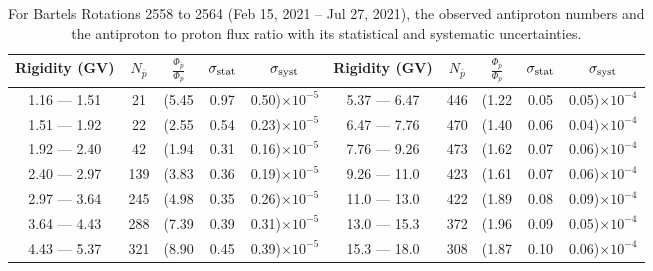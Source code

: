 \begin{table}[p] 
\renewcommand\baselinestretch{1.3}\selectfont
\setlength\tabcolsep{3pt}
\centering
\begin{tabular}{ccccc | ccccc}
\hline
\textbf{Rigidity}  (GV)  & $N_{\bar{p}}$ & $\frac{\Phi_{\bar{p}}}{\Phi_{p}}$ & $\sigma_{\rm{stat}}$ & $\sigma_{\rm{syst}}$ \hspace{1cm}   & \textbf{Rigidity}  (GV)  & $N_{\bar{p}}$ & $\frac{\Phi_{\bar{p}}}{\Phi_{p}}$ & $\sigma_{\rm{stat}}$ & $\sigma_{\rm{syst}}$ \hspace{1cm} \\ 
\hline
1.16 — 1.51   &  21                  &(5.45                          &  0.97              &      0.50)$\times 10^{-5}$  & 5.37 — 6.47                &  446                    &(1.22                               &  0.05                   &      0.05)$\times 10^{-4}$\\
1.51 — 1.92   &  22                  &(2.55                          &  0.54              &      0.23)$\times 10^{-5}$  & 6.47 — 7.76                &  470                    &(1.40                               &  0.06                   &      0.04)$\times 10^{-4}$\\
1.92 — 2.40   &  42                  &(1.94                          &  0.31              &      0.16)$\times 10^{-5}$  & 7.76 — 9.26                &  473                    &(1.62                                &  0.07                   &      0.06)$\times 10^{-4}$\\    
2.40 — 2.97   &  139                &(3.83                          &  0.36              &      0.19)$\times 10^{-5}$  & 9.26 — 11.0                &  423                    &(1.61                                &  0.07                   &      0.06)$\times 10^{-4}$\\    
2.97 — 3.64   &  245                &(4.98                          &  0.35              &      0.26)$\times 10^{-5}$  & 11.0 — 13.0                 &  422                    &(1.89                                &  0.08                   &      0.09)$\times 10^{-4}$\\
3.64 — 4.43   &  288                &(7.39                          &  0.39              &      0.31)$\times 10^{-5}$  & 13.0 — 15.3               &  372                    &(1.96                                &  0.09                   &      0.05)$\times 10^{-4}$\\
4.43 — 5.37   &  321                &(8.90                          &  0.45              &      0.39)$\times 10^{-5}$  & 15.3 — 18.0               &  308                    &(1.87                                &  0.10                   &      0.06)$\times 10^{-4}$\\
\hline
\end{tabular}
\caption[Antiproton to proton flux ratio for Bartels Rotations 2558 to 2564]{For Bartels Rotations 2558 to 2564 (Feb 15, 2021 – Jul 27, 2021), the observed antiproton numbers and the antiproton to proton flux ratio with its statistical and systematic uncertainties.}
\label{TableOfDependent23}
\end{table}